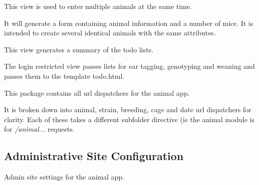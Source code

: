 \documentclass[letterpaper,10pt,english]{sphinxmanual}
\begin{document}

\begin{fulllineitems}
\label{api:mousedb.animal.views.multiple_pups}
This view is used to enter multiple animals at the same time.

It will generate a form containing animal information and a number of mice.  It is intended to create several identical animals with the same attributes.

\end{fulllineitems}



\begin{fulllineitems}
\label{api:mousedb.animal.views.todo}
This view generates a summary of the todo lists.

The login restricted view passes lists for ear tagging, genotyping and weaning and passes them to the template todo.html.

\end{fulllineitems}

\label{api:module-mousedb.animal.urls}
This package contains all url dispatchers for the animal app.

It is broken down into animal, strain, breeding, cage and date url dispatchers for clarity.
Each of these takes a different subfolder directive (ie the animal module is for \emph{/animal...} requests.


\subsection{Administrative Site Configuration}
\label{api:id6}\label{api:module-mousedb.animal.admin}
Admin site settings for the animal app.

\end{document}

